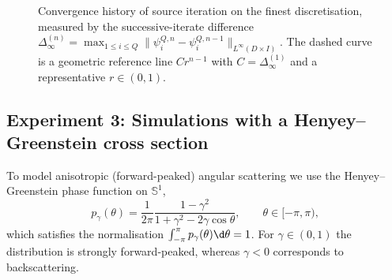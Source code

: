 \documentclass[final]{amsart}
\begin{document}
\begin{figure}[h!]
  \centering
  \begin{subfigure}{.5\linewidth}
  \end{subfigure}
  \caption{\label{fig:algo_convergence} Convergence history of source
    iteration on the finest discretisation, measured by the
    successive-iterate difference $\Delta_\infty^{(n)}=\max_{1\le i\le
      Q}\|\psi^{Q,n}_i-\psi^{Q,n-1}_i\|_{L^\infty(D\times I)}$. The
    dashed curve is a geometric reference line $C r^{ n-1}$ with
    $C=\Delta_\infty^{(1)}$ and a representative $r\in(0,1)$.}
\end{figure}

\subsection{Experiment 3: Simulations with a Henyey--Greenstein cross section}
\label{exp3:HG}

To model anisotropic (forward-peaked) angular scattering we use the
Henyey--Greenstein phase function on $\mathbb S^{1}$,
\begin{equation}
  \label{eq:HG_phase}
  p_{\gamma}(\theta)
  =
  \frac{1}{2\pi}\frac{1-\gamma^2}{1+\gamma^2-2\gamma\cos\theta},
  \qquad \theta\in[-\pi,\pi),
\end{equation}
which satisfies the normalisation $\int_{-\pi}^{\pi} p_{\gamma}(\theta) \d\theta = 1$.
For $\gamma\in(0,1)$ the distribution is strongly forward-peaked, whereas
$\gamma<0$ corresponds to backscattering.
\end{document}
